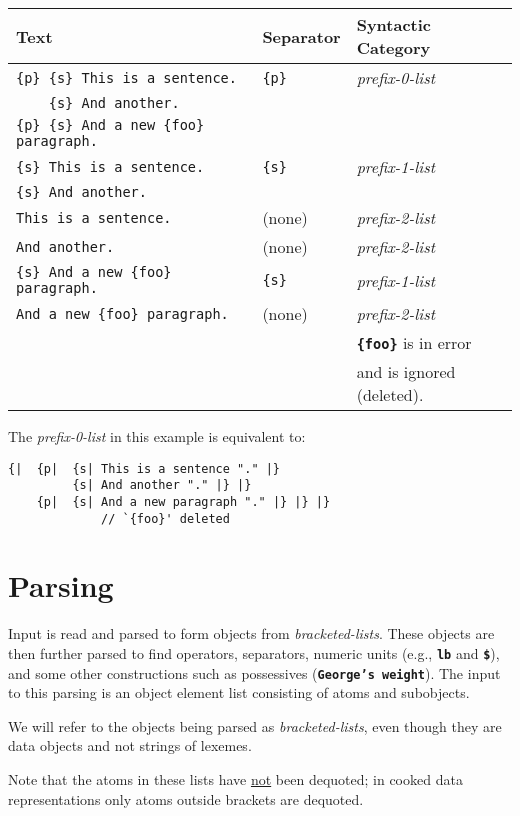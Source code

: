 \documentclass[12pt]{article}
\newcommand{\TT}[1]{{\tt \bfseries #1}}
\newenvironment{indpar}[1][0.3in]%
	{\begin{list}{}%
		     {\setlength{\itemsep}{0in}%
		      \setlength{\topsep}{0in}%
		      \setlength{\parsep}{1ex}%
		      \setlength{\labelwidth}{#1}%
		      \setlength{\leftmargin}{#1}%
		      \addtolength{\leftmargin}{\labelsep}}%
	 \item}%
	{\end{list}}
\begin{document}
\begin{tabular}{lll}
Text	& Separator &  Syntactic Category
\\\hline
\tt \{p\} \{s\} This is a sentence.	& \tt \{p\} & \em prefix-0-list \\
\tt ~~~ \{s\} And another. \\
\tt \{p\} \{s\} And a new \{foo\} paragraph.
\\\hline
\tt \{s\} This is a sentence.	& \tt \{s\} & \em prefix-1-list \\
\tt \{s\} And another.
\\\hline
\tt This is a sentence.	& (none) & \em prefix-2-list
\\\hline
\tt And another. & (none) & \em prefix-2-list
\\\hline
\tt \{s\} And a new \{foo\} paragraph. & \tt \{s\} & \em prefix-1-list
\\\hline
\tt And a new \{foo\} paragraph. & (none) & \em prefix-2-list \\
			       &        & \TT{\{foo\}} is in error \\
			       &        & and is ignored (deleted).
\end{tabular}

The {\em prefix-0-list} in this example is equivalent to:
\begin{indpar}\begin{verbatim}
{|  {p|  {s| This is a sentence "." |}
         {s| And another "." |} |}
    {p|  {s| And a new paragraph "." |} |} |}
             // `{foo}' deleted
\end{verbatim}\end{indpar}

\section{Parsing}
\label{PARSING}

Input is read and parsed to form objects from {\em bracketed-lists}.
These objects are then further parsed to find operators, separators,
numeric units (e.g., \TT{lb} and \TT{\$}), and some other constructions
such as possessives (\TT{George's weight}).  The input to this parsing
is an object element list consisting of atoms and subobjects.

We will refer to the objects being parsed as {\em bracketed-lists}, even
though they are data objects and not strings of lexemes.

Note that the atoms in these lists have \underline{not} been dequoted;
in cooked data representations only atoms outside brackets are dequoted.
\end{document}
